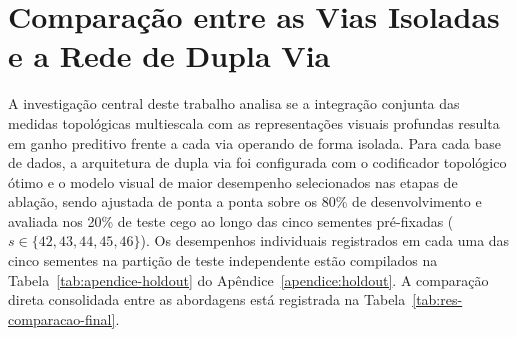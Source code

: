 \section{Comparação entre as Vias Isoladas e a Rede de Dupla Via}
\label{sec:res-dupla-via}

A investigação central deste trabalho analisa se a integração conjunta das medidas topológicas multiescala com as representações visuais profundas resulta em ganho preditivo frente a cada via operando de forma isolada. Para cada base de dados, a arquitetura de dupla via foi configurada com o codificador topológico ótimo e o modelo visual de maior desempenho selecionados nas etapas de ablação, sendo ajustada de ponta a ponta sobre os 80\% de desenvolvimento e avaliada nos 20\% de teste cego ao longo das cinco sementes pré-fixadas ($s \in \{42, 43, 44, 45, 46\}$). Os desempenhos individuais registrados em cada uma das cinco sementes na partição de teste independente estão compilados na Tabela~\ref{tab:apendice-holdout} do Apêndice~\ref{apendice:holdout}. A comparação direta consolidada entre as abordagens está registrada na Tabela~\ref{tab:res-comparacao-final}.

